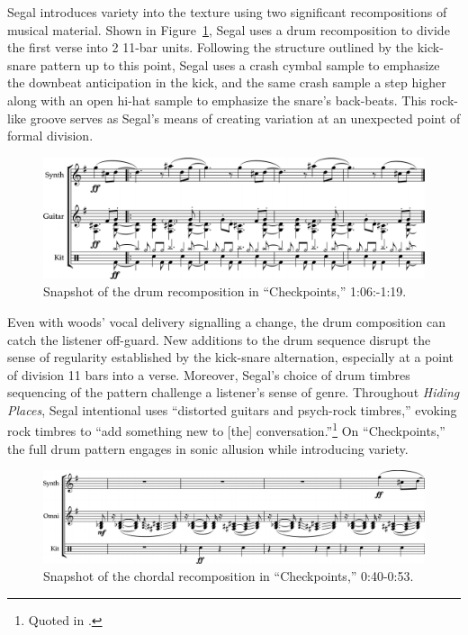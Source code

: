 Segal introduces variety into the texture using two significant recompositions of musical material. Shown in Figure~\ref{fig:checkpointsmain}, Segal uses a drum recomposition to divide the first verse into 2 11-bar units. Following the structure outlined by the kick-snare pattern up to this point, Segal uses a crash cymbal sample to emphasize the downbeat anticipation in the kick, and the same crash sample a step higher along with an open hi-hat sample to emphasize the snare's back-beats. This rock-like groove serves as Segal's means of creating variation at an unexpected point of formal division.

    \begin{figure}[ht]
        \centering
        \includegraphics[width=\textwidth]{images/figures/chp 02/106119checkpointsmain.pdf}
        \caption{Snapshot of the drum recomposition in ``Checkpoints,'' 1:06:-1:19.}
        \label{fig:checkpointsmain}
    \end{figure}

Even with woods' vocal delivery signalling a change, the drum composition can catch the listener off-guard. New additions to the drum sequence disrupt the sense of regularity established by the kick-snare alternation, especially at a point of division 11 bars into a verse. Moreover, Segal's choice of drum timbres sequencing of the pattern challenge a listener's sense of genre. Throughout \emph{Hiding Places}, Segal intentional uses ``distorted guitars and psych-rock timbres,'' evoking rock timbres to ``add something new to [the] conversation.''\footnote{Quoted in \cite{backwoodzhiphopKennySegalPresents2019}.} On ``Checkpoints,'' the full drum pattern engages in sonic allusion while introducing variety.

    \begin{figure}[ht]
        \centering
        \includegraphics[width=\textwidth]{images/figures/chp 02/040053checkpointsrecomp.pdf}
        \caption{Snapshot of the chordal recomposition in ``Checkpoints,'' 0:40-0:53.}
        \label{fig:checkpointsrecomp}
    \end{figure}

